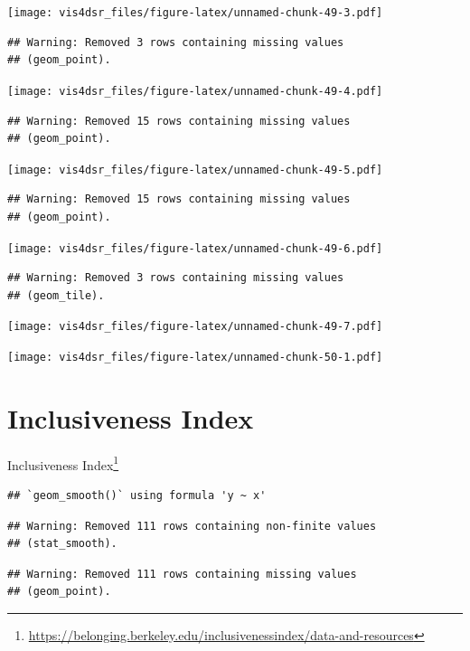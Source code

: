 \documentclass[
]{krantz}
\renewcommand{\href}[2]{#2\footnote{\url{#1}}}
\begin{document}
\texttt{[image: vis4dsr\_files/figure-latex/unnamed-chunk-49-3.pdf]}

\begin{verbatim}
## Warning: Removed 3 rows containing missing values
## (geom_point).
\end{verbatim}

\texttt{[image: vis4dsr\_files/figure-latex/unnamed-chunk-49-4.pdf]}

\begin{verbatim}
## Warning: Removed 15 rows containing missing values
## (geom_point).
\end{verbatim}

\texttt{[image: vis4dsr\_files/figure-latex/unnamed-chunk-49-5.pdf]}

\begin{verbatim}
## Warning: Removed 15 rows containing missing values
## (geom_point).
\end{verbatim}

\texttt{[image: vis4dsr\_files/figure-latex/unnamed-chunk-49-6.pdf]}

\begin{verbatim}
## Warning: Removed 3 rows containing missing values
## (geom_tile).
\end{verbatim}

\texttt{[image: vis4dsr\_files/figure-latex/unnamed-chunk-49-7.pdf]}

\texttt{[image: vis4dsr\_files/figure-latex/unnamed-chunk-50-1.pdf]}

\hypertarget{inclusiveness-index}{%
\section*{Inclusiveness Index}\label{inclusiveness-index}}


\href{https://belonging.berkeley.edu/inclusivenessindex/data-and-resources}{Inclusiveness Index}

\begin{verbatim}
## `geom_smooth()` using formula 'y ~ x'
\end{verbatim}

\begin{verbatim}
## Warning: Removed 111 rows containing non-finite values
## (stat_smooth).
\end{verbatim}

\begin{verbatim}
## Warning: Removed 111 rows containing missing values
## (geom_point).
\end{verbatim}
\end{document}
